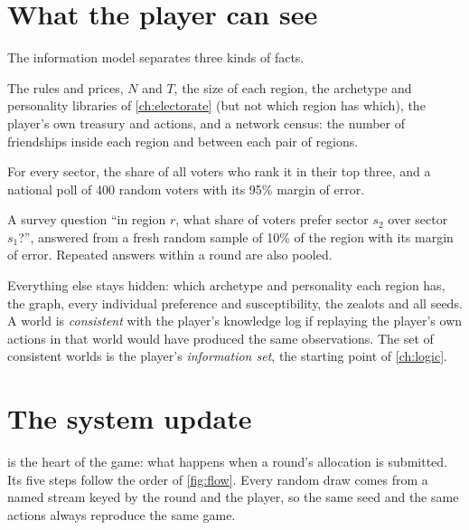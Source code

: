 \documentclass[11pt,a4paper,oneside]{report}
\newcommand{\coins}[1]{#1~coins}
\begin{document}
\section{What the player can see}

The information model separates three kinds of facts.
\begin{description}[leftmargin=0pt,style=nextline]
  \item[Public at all times.] The rules and prices, $N$ and $T$, the size of each region, the archetype
        and personality libraries of \cref{ch:electorate} (but not which region has which), the player's
        own treasury and actions, and a network census: the number of friendships inside each region and
        between each pair of regions.
  \item[Free each round.] For every sector, the share of all voters who rank it in their top three, and a
        national poll of 400 random voters with its 95\% margin of error.
  \item[Paid, \coins{10} each.] A survey question ``in region $r$, what share of voters prefer sector $s_2$
        over sector $s_1$?'', answered from a fresh random sample of 10\% of the region with its margin of
        error. Repeated answers within a round are also pooled.
\end{description}
Everything else stays hidden: which archetype and personality each region has, the graph, every
individual preference and susceptibility, the zealots and all seeds. A world is \emph{consistent} with
the player's knowledge log if replaying the player's own actions in that world would have produced the
same observations. The set of consistent worlds is the player's \emph{information set}, the starting
point of \cref{ch:logic}.

\section{The system update}

 is the heart of the game: what happens when a round's allocation is submitted. Its five
steps follow the order of \cref{fig:flow}. Every random draw comes from a named stream keyed by the round
and the player, so the same seed and the same actions always reproduce the same game.
\end{document}
